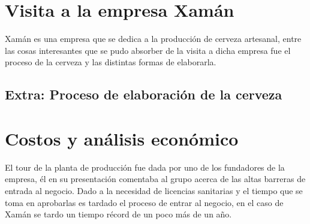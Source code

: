 \documentclass{article}
\begin{document}
\maketitle

\tikzblockdefinitions

\section{Visita a la empresa Xamán}
Xamán es una empresa que se dedica a la producción de cerveza artesanal, entre las cosas interesantes que se pudo absorber de la visita a dicha empresa fue el proceso de la cerveza y las distintas formas de elaborarla. 


\subsection{Extra: Proceso de elaboración de la cerveza}
\begin{center}    
\end{center}

\section{Costos y análisis económico}
El tour de la planta de producción fue dada por uno de los fundadores de la empresa, él en su presentación comentaba al grupo acerca de las altas barreras de entrada al negocio. Dado a la necesidad de licencias sanitarias y el tiempo que se toma en aprobarlas es tardado el proceso de entrar al negocio, en el caso de Xamán se tardo un tiempo récord de un poco más de un año.
\end{document}

